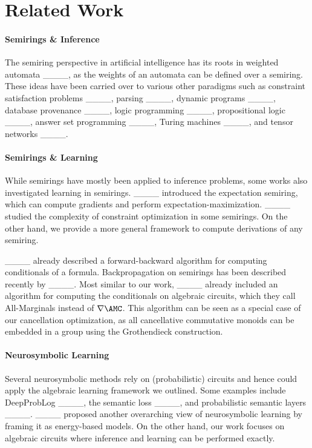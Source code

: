 \section{Related Work}
\label{sec:related_work}

\paragraph{Semirings \& Inference} The semiring perspective in artificial intelligence has its roots in weighted automata ____, as the weights of an automata can be defined over a semiring. These ideas have been carried over to various other paradigms such as constraint satisfaction problems ____, parsing ____, dynamic programs ____, database provenance ____, logic programming ____, propositional logic ____, answer set programming ____, Turing machines ____, and tensor networks ____.

\paragraph{Semirings \& Learning} While semirings have mostly been applied to inference problems, some works also investigated learning in semirings. ____ introduced the expectation semiring, which can compute gradients and perform expectation-maximization. ____ studied the complexity of constraint optimization in some semirings. On the other hand, we provide a more general framework to compute derivations of any semiring.

%
____ already described a forward-backward algorithm for computing conditionals of a formula. Backpropagation on semirings has been described recently by ____. Most similar to our work, ____ already included an algorithm for computing the conditionals on algebraic circuits, which they call All-Marginals instead of $\nabla \AMC$. This algorithm can be seen as a special case of our cancellation optimization, as all cancellative commutative monoids can be embedded in a group using the Grothendieck construction. %


\paragraph{Neurosymbolic Learning} Several neurosymbolic methods rely on (probabilistic) circuits and hence could apply the algebraic learning framework we outlined. Some examples include DeepProbLog ____, the semantic loss ____, and probabilistic semantic layers ____. ____ proposed another overarching view of neurosymbolic learning by framing it as energy-based models. On the other hand, our work focuses on algebraic circuits where inference and learning can be performed exactly.